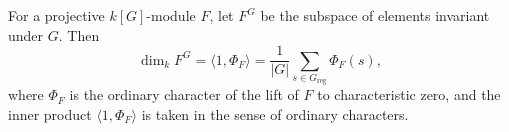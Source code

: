 For a projective $k[G]$-module $F$, let $F^G$ be the subspace of elements invariant under $G$. Then
$$\dim_k F^G = \langle 1, \Phi_F \rangle = \frac{1}{|G|} \sum_{s \in G_{\text{reg}}} \Phi_F(s),$$
where $\Phi_F$ is the ordinary character of the lift of $F$ to characteristic zero, and the inner product $\langle 1, \Phi_F \rangle$ is taken in the sense of ordinary characters.
